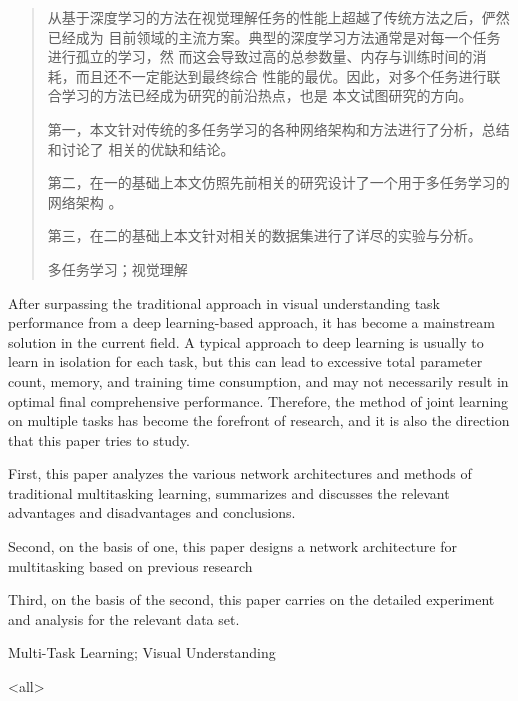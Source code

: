 \documentclass[../main]{subfiles}
\begin{document}
\mode*

\begin{abstract}
  从基于深度学习的方法在视觉理解任务的性能上超越了传统方法之后，俨然已经成为
  目前领域的主流方案。典型的深度学习方法通常是对每一个任务进行孤立的学习，然
  而这会导致过高的总参数量、内存与训练时间的消耗，而且还不一定能达到最终综合
  性能的最优。因此，对多个任务进行联合学习的方法已经成为研究的前沿热点，也是
  本文试图研究的方向。

  第一，本文针对传统的多任务学习的各种网络架构和方法进行了分析，总结和讨论了
  相关的优缺和结论。

  第二，在一的基础上本文仿照先前相关的研究设计了一个用于多任务学习的网络架构
  。

  第三，在二的基础上本文针对相关的数据集进行了详尽的实验与分析。

\begin{keyword}
  多任务学习；视觉理解
\end{keyword}
\end{abstract}

\begin{abstract*}
  After surpassing the traditional approach in visual understanding task
  performance from a deep learning-based approach, it has become a mainstream
  solution in the current field. A typical approach to deep learning is
  usually to learn in isolation for each task, but this can lead to excessive
  total parameter count, memory, and training time consumption, and may not
  necessarily result in optimal final comprehensive performance. Therefore,
  the method of joint learning on multiple tasks has become the forefront of
  research, and it is also the direction that this paper tries to study.

  First, this paper analyzes the various network architectures and methods of
  traditional multitasking learning, summarizes and discusses the relevant
  advantages and disadvantages and conclusions.

  Second, on the basis of one, this paper designs a network architecture for
  multitasking based on previous research

  Third, on the basis of the second, this paper carries on the detailed
  experiment and analysis for the relevant data set.

\begin{keyword*}
  Multi-Task Learning; Visual Understanding
\end{keyword*}
\end{abstract*}

\mode<all>
\end{document}

